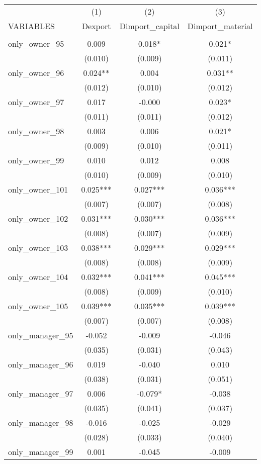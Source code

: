 \begin{tabular}{lccc} \hline
 & (1) & (2) & (3) \\
VARIABLES & Dexport & Dimport\_capital & Dimport\_material \\ \hline
 &  &  &  \\
only\_owner\_95 & 0.009 & 0.018* & 0.021* \\
 & (0.010) & (0.009) & (0.011) \\
only\_owner\_96 & 0.024** & 0.004 & 0.031** \\
 & (0.012) & (0.010) & (0.012) \\
only\_owner\_97 & 0.017 & -0.000 & 0.023* \\
 & (0.011) & (0.011) & (0.012) \\
only\_owner\_98 & 0.003 & 0.006 & 0.021* \\
 & (0.009) & (0.010) & (0.011) \\
only\_owner\_99 & 0.010 & 0.012 & 0.008 \\
 & (0.010) & (0.009) & (0.010) \\
only\_owner\_101 & 0.025*** & 0.027*** & 0.036*** \\
 & (0.007) & (0.007) & (0.008) \\
only\_owner\_102 & 0.031*** & 0.030*** & 0.036*** \\
 & (0.008) & (0.007) & (0.009) \\
only\_owner\_103 & 0.038*** & 0.029*** & 0.029*** \\
 & (0.008) & (0.008) & (0.009) \\
only\_owner\_104 & 0.032*** & 0.041*** & 0.045*** \\
 & (0.008) & (0.009) & (0.010) \\
only\_owner\_105 & 0.039*** & 0.035*** & 0.039*** \\
 & (0.007) & (0.007) & (0.008) \\
only\_manager\_95 & -0.052 & -0.009 & -0.046 \\
 & (0.035) & (0.031) & (0.043) \\
only\_manager\_96 & 0.019 & -0.040 & 0.010 \\
 & (0.038) & (0.031) & (0.051) \\
only\_manager\_97 & 0.006 & -0.079* & -0.038 \\
 & (0.035) & (0.041) & (0.037) \\
only\_manager\_98 & -0.016 & -0.025 & -0.029 \\
 & (0.028) & (0.033) & (0.040) \\
only\_manager\_99 & 0.001 & -0.045 & -0.009 \\

\end{tabular}
